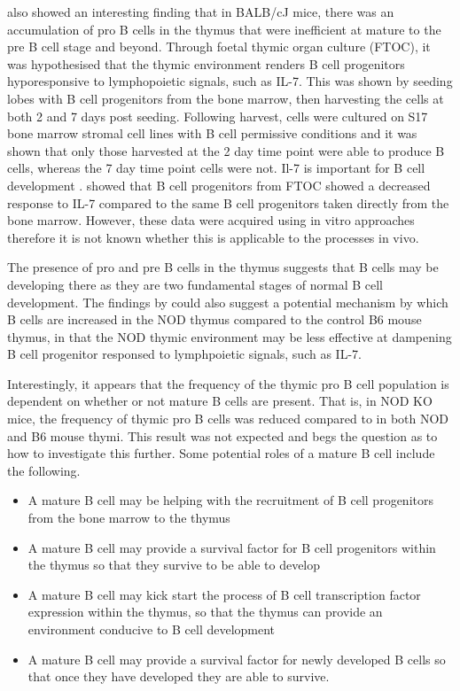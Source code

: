 \citet{Hashimoto2002} also showed an interesting finding that in BALB/cJ mice, there was an accumulation of pro B cells in the thymus that were inefficient at mature to the pre B cell stage and beyond.
Through foetal thymic organ culture (FTOC), it was hypothesised that the thymic environment renders B cell progenitors hyporesponsive to lymphopoietic signals, such as IL-7.
This was shown by seeding lobes with B cell progenitors from the bone marrow, then harvesting the cells at both 2 and 7 days post seeding.
Following harvest, cells were cultured on S17 bone marrow stromal cell lines with B cell permissive conditions and it was shown that only those harvested at the 2 day time point were able to produce B cells, whereas the 7 day time point cells were not.
Il-7 is important for B cell development \citep{Corfe2012}. \citet{Hashimoto2002} showed that B cell progenitors from FTOC showed a decreased response to IL-7 compared to the same B cell progenitors taken directly from the bone marrow.
However, these data were acquired using in vitro approaches therefore it is not known whether this is applicable to the processes in vivo.

The presence of pro and pre B cells in the thymus suggests that B cells may be developing there as they are two fundamental stages of normal B cell development.
The findings by \citet{Hashimoto2002} could also suggest a potential mechanism by which B cells are increased in the NOD thymus compared to the control B6 mouse thymus, in that the NOD thymic environment may be less effective at dampening B cell progenitor responsed to lymphpoietic signals, such as IL-7.

Interestingly, it appears that the frequency of the thymic pro B cell population is dependent on whether or not mature B cells are present.
That is, in NOD KO mice, the frequency of thymic pro B cells was reduced compared to in both NOD and B6 mouse thymi.
This result was not expected and begs the question as to how to investigate this further.
Some potential roles of a mature B cell include the following.
\begin{itemize}
\item A mature B cell may be helping with the recruitment of B cell progenitors from the bone marrow to the thymus
\item A mature B cell may provide a survival factor for B cell progenitors within the thymus so that they survive to be able to develop
\item A mature B cell may kick start the process of B cell transcription factor expression within the thymus, so that the thymus can provide an environment conducive to B cell development
\item A mature B cell may provide a survival factor for newly developed B cells so that once they have developed they are able to survive.
\end{itemize}

